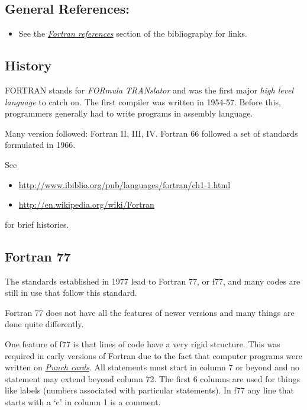 \documentclass[letterpaper,10pt,english]{sphinxmanual}
\begin{document}
\subsection{General References:}
\label{fortran:general-references}\begin{itemize}
\item {} 
See the {\hyperref[biblio:biblio-fortran]{\emph{Fortran references}}} section of the bibliography for links.

\end{itemize}


\subsection{History}
\label{fortran:history}
FORTRAN stands for \emph{FORmula TRANslator} and was the first major \emph{high
level language} to catch on.  The first compiler was written in
1954-57.  Before this, programmers generally had to write programs in
assembly language.

Many version followed: Fortran II, III, IV. Fortran 66
followed a set of standards formulated in 1966.

See
\begin{itemize}
\item {} 
\href{http://www.ibiblio.org/pub/languages/fortran/ch1-1.html}{http://www.ibiblio.org/pub/languages/fortran/ch1-1.html}

\item {} 
\href{http://en.wikipedia.org/wiki/Fortran}{http://en.wikipedia.org/wiki/Fortran}

\end{itemize}

for brief histories.


\subsection{Fortran 77}
\label{fortran:fortran-77}
The standards established in 1977 lead to Fortran 77, or f77, and
many codes are still in use that follow this standard.

Fortran 77 does not have all the features of newer versions and many
things are done quite differently.

One feature of f77 is that lines of code have a very rigid structure.
This was required in early versions of Fortran due to the fact that
computer programs were written on {\hyperref[punchcard:punchcard]{\emph{Punch cards}}}.  All statements
must start in column 7 or beyond and no statement may extend beyond
column 72. The first 6 columns are used for things like labels
(numbers associated with particular statements).  In f77 any line
that starts with a `c' in column 1 is a comment.
\end{document}
